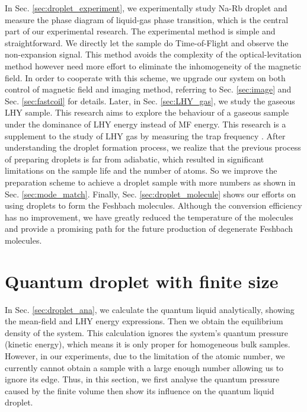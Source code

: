 In Sec. \ref{sec:droplet_experiment}, we experimentally study Na-Rb droplet and measure the phase diagram of liquid-gas phase transition, which is the central part of our experimental research. The experimental method is simple and straightforward. We directly let the sample do Time-of-Flight and observe the non-expansion signal. This method avoids the complexity of the optical-levitation method however need more effort to eliminate the inhomogeneity of the magnetic field. In order to cooperate with this scheme, we upgrade our system on both control of magnetic field and imaging method, referring to Sec. \ref{sec:image} and Sec. \ref{sec:fastcoil} for details. Later, in Sec. \ref{sec:LHY_gas}, we study the gaseous LHY sample. This research aims to explore the behaviour of a gaseous sample under the dominance of LHY energy instead of MF energy. This research is a supplement to the study of LHY gas by measuring the trap frequency \cite{skov2020}. After understanding the droplet formation process, we realize that the previous process of preparing droplets is far from adiabatic, which resulted in significant limitations on the sample life and the number of atoms. So we improve the preparation scheme to achieve a droplet sample with more numbers as shown in Sec. \ref{sec:mode_match}. Finally, Sec. \ref{sec:droplet_molecule} shows our efforts on using droplets to form the Feshbach molecules. Although the conversion efficiency has no improvement, we have greatly reduced the temperature of the molecules and provide a promising path for the future production of degenerate Feshbach molecules.


\section{Quantum droplet with finite size}

In Sec. \ref{sec:droplet_ana}, we calculate the quantum liquid analytically, showing the mean-field and LHY energy expressions. Then we obtain the equilibrium density of the system. This calculation ignores the system's quantum pressure (kinetic energy), which means it is only proper for homogeneous bulk samples. However, in our experiments, due to the limitation of the atomic number, we currently cannot obtain a sample with a large enough number allowing us to ignore its edge. Thus, in this section, we first analyse the quantum pressure caused by the finite volume then show its influence on the quantum liquid droplet. 

